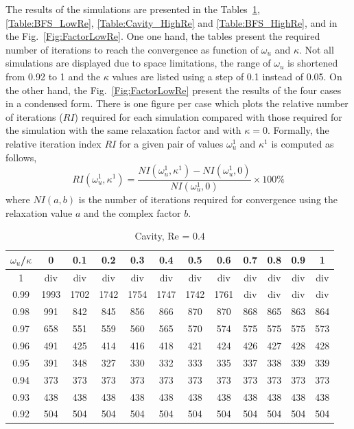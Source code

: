 \documentclass[final,3p,times,11pt,onecolumn]{myElsarticle}
\numberwithin{equation}{section}
\begin{document}
The results of the simulations are presented in the Tables~\ref{Table:Cavity_LowRe}, \ref{Table:BFS_LowRe}, \ref{Table:Cavity_HighRe} and \ref{Table:BFS_HighRe}, and in the Fig.~\ref{Fig:FactorLowRe}. One one hand, the tables present the required number of iterations to reach the convergence as function of $\omega_u$ and $\kappa$. Not all simulations are displayed due to space limitations, the range of $\omega_u$ is shortened from 0.92 to 1 and the $\kappa$ values are listed using a step of 0.1 instead of 0.05. On the other hand, the Fig.~\ref{Fig:FactorLowRe} present the results of the four cases in a condensed form. There is one figure per case which plots the relative number of iterations ($RI$) required for each simulation compared with those required for the simulation with the same relaxation factor and with $\kappa = 0$. Formally, the relative iteration index $RI$ for a given pair of values $\omega_u^1$ and $\kappa^1$ is computed as follows,
\begin{equation}
\label{Eq:relativeIndex}
RI(\omega_u^1, \kappa^1)
=
\dfrac
{
NI(\omega_u^1, \kappa^1) - NI(\omega_u^1, 0)
}
{
NI(\omega_u^1, 0)
}
\times
100 \%
\end{equation}
where $NI(a,b)$ is the number of iterations required for convergence using the relaxation value $a$ and the complex factor $b$.

\begin{table}[t!]
\centering
\begin{tabular}{c|ccccccccccc}
\hline 
$\omega_u$/$\kappa$ & 0 & 0.1 & 0.2 & 0.3 & 0.4 & 0.5 & 0.6 & 0.7 & 0.8 & 0.9 & 1 \\ 
\hline 
1 & div & div & div & div & div & div & div & div & div & div & div \\ 
0.99 & 1993 & 1702 & 1742 & 1754 & 1747 & 1742 & 1761 & div & div & div & div \\ 
0.98 & 991 & 842  & 845 & 856 & 866 & 870 & 870 & 868 & 865 & 863 & 864 \\ 
0.97 & 658 & 551  & 559 & 560 & 565 & 570 & 574 & 575 & 575 & 575 & 573 \\ 
0.96 & 491 &425  & 414 & 416 & 418 & 421 & 424 & 426 & 427 & 428 & 428 \\ 
0.95 & 391 & 348 & 327 & 330 & 332 & 333 & 335 & 337 & 338 & 339 & 339 \\ 
0.94 & 373 & 373 & 373 & 373 & 373 & 373 & 373 & 373 & 373 & 373 & 373 \\ 
0.93 & 438 & 438 & 438 & 438 & 438 & 438 & 438 & 438 & 438 & 438 & 438 \\ 
0.92 & 504 & 504 & 504 & 504 & 504 & 504 & 504 & 504 & 504 & 504 & 504 \\ 
\hline 
\end{tabular} 
\caption{Cavity, Re = $0.4$}
\label{Table:Cavity_LowRe}
\end{table}
\end{document}
